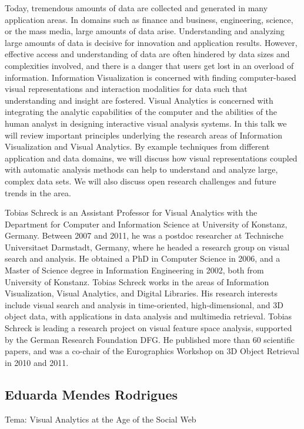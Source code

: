 Today, tremendous amounts of data are collected and generated in many application areas. In domains such as finance and business, engineering, science, or the mass media, large amounts of data arise. Understanding and analyzing large amounts of data is decisive for innovation and application results. However, effective access and understanding of data are often hindered by data sizes and complexities involved, and there is a danger that users get lost in an overload of information. Information Visualization is concerned with finding computer-based visual representations and interaction modalities for data such that understanding and insight are fostered. Visual Analytics is concerned with integrating the analytic capabilities of the computer and the abilities of the human analyst in designing interactive visual analysis systems. In this talk we will review important principles underlying the research areas of Information Visualization and Visual Analytics. By example techniques from different application and data domains, we will discuss how visual representations coupled with automatic analysis methods can help to understand and analyze large, complex data sets. We will also discuss open research challenges and future trends in the area.

Tobias Schreck is an Assistant Professor for Visual Analytics with the Department for Computer and Information Science at University of Konstanz, Germany. Between 2007 and 2011, he was a postdoc researcher at Technische Universitaet Darmstadt, Germany, where he headed a research group on visual search and analysis. He obtained a PhD in Computer Science in 2006, and a Master of Science degree in Information Engineering in 2002, both from University of Konstanz. Tobias Schreck works in the areas of Information Visualization, Visual Analytics, and Digital Libraries. His research interests include visual search and analysis in time-oriented, high-dimensional, and 3D object data, with applications in data analysis and multimedia retrieval. Tobias Schreck is leading a research project on visual feature space analysis, supported by the German Research Foundation DFG. He published more than 60 scientific papers, and was a co-chair of the Eurographics Workshop on 3D Object Retrieval in 2010 and 2011.

\subsection{Eduarda Mendes Rodrigues}
Tema: Visual Analytics at the Age of the Social Web

